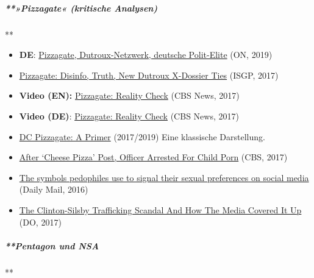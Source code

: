 \hypertarget{pizzagate-kritische-analysen}{%
\subparagraph{**»Pizzagate« (kritische
Analysen)}\label{pizzagate-kritische-analysen}}

**

\begin{itemize}
\tightlist
\item
  \textbf{DE}:
  \href{https://olivernevermind.wordpress.com/2019/01/02/der-kreis-schliesst-sich-pizzagate-dutroux-netzwerk-deutsche-polit-elite/}{Pizzagate,
  Dutroux-Netzwerk, deutsche Polit-Elite} (ON, 2019)
\item
  \href{https://isgp-studies.com/pizzagate}{Pizzagate: Disinfo, Truth,
  New Dutroux X-Dossier Ties} (ISGP, 2017)
\item
  \textbf{Video (EN):}
  \href{https://www.youtube.com/watch?v=-GZFHLAcG8A}{Pizzagate: Reality
  Check} (CBS News, 2017)
\item
  \textbf{Video (DE)}:
  \href{https://www.youtube.com/watch?v=wi5Dqxyb-0s}{Pizzagate: Reality
  Check} (CBS News, 2017)
\item
  \href{https://dcpizzagate.wordpress.com/}{DC Pizzagate: A Primer}
  (2017/2019) Eine klassische Darstellung.
\item
  \href{https://philadelphia.cbslocal.com/2017/10/23/child-porn-cheese-pizza-arrest/}{After
  `Cheese Pizza' Post, Officer Arrested For Child Porn} (CBS, 2017)
\item
  \href{https://www.dailymail.co.uk/news/article-3560069/The-symbols-pedophiles-use-signal-sordid-sexual-preferences-social-media.html}{The
  symbols pedophiles use to signal their sexual preferences on social
  media} (Daily Mail, 2016)
\item
  \href{https://web.archive.org/web/20180709151801/https://disobedientmedia.com/2017/01/the-clinton-silsby-trafficking-scandal-and-how-the-media-covered-it-up/}{The
  Clinton-Silsby Trafficking Scandal And How The Media Covered It Up}
  (DO, 2017)
\end{itemize}

\hypertarget{pentagon-und-nsa}{%
\subparagraph{**Pentagon und NSA}\label{pentagon-und-nsa}}

**


